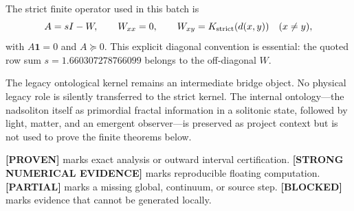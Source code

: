 \documentclass[11pt,a4paper]{article}
\newcommand{\Proven}{\textcolor{proved}{\textbf{[PROVEN]}}}
\newcommand{\Evidence}{\textcolor{conditional}{\textbf{[STRONG NUMERICAL EVIDENCE]}}}
\newcommand{\Partial}{\textcolor{conditional}{\textbf{[PARTIAL]}}}
\newcommand{\Blocked}{\textcolor{blocked}{\textbf{[BLOCKED]}}}
\begin{document}
The strict finite operator used in this batch is
\[
A=sI-W,\qquad W_{xx}=0,\qquad
W_{xy}=K_{\rm strict}(d(x,y))\quad(x\ne y),
\]
with $A\mathbf1=0$ and $A\succeq0$. This explicit diagonal convention is essential: the
quoted row sum $s=1.660307278766099$ belongs to the off-diagonal $W$.

The legacy ontological kernel remains an intermediate bridge object. No physical legacy
role is silently transferred to the strict kernel. The internal ontology---the nadsoliton
itself as primordial fractal information in a solitonic state, followed by light, matter,
and an emergent observer---is preserved as project context but is not used to prove the
finite theorems below.

\Proven{} marks exact analysis or outward interval certification. \Evidence{} marks
reproducible floating computation. \Partial{} marks a missing global, continuum, or source
step. \Blocked{} marks evidence that cannot be generated locally.
\end{document}
